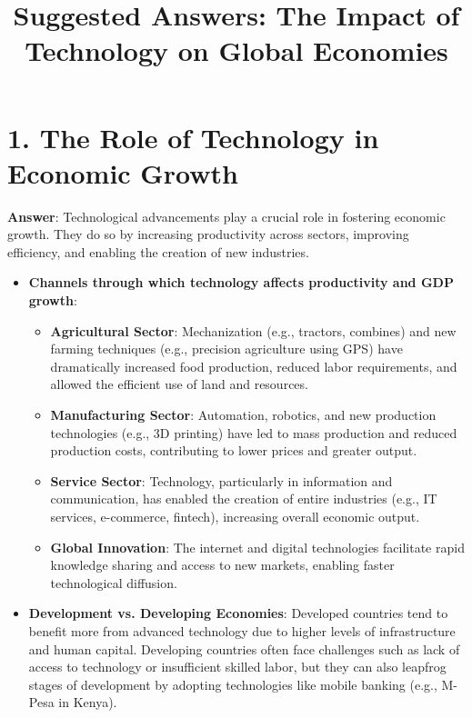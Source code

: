 \documentclass{article}
\title{Suggested Answers: The Impact of Technology on Global Economies}
\author{}
\date{}
\begin{document}
\maketitle

\section*{1. The Role of Technology in Economic Growth}
\textbf{Answer}:  
Technological advancements play a crucial role in fostering economic growth. They do so by increasing productivity across sectors, improving efficiency, and enabling the creation of new industries. 

\begin{itemize}
    \item \textbf{Channels through which technology affects productivity and GDP growth}:
    \begin{itemize}
        \item \textbf{Agricultural Sector}: Mechanization (e.g., tractors, combines) and new farming techniques (e.g., precision agriculture using GPS) have dramatically increased food production, reduced labor requirements, and allowed the efficient use of land and resources.
        \item \textbf{Manufacturing Sector}: Automation, robotics, and new production technologies (e.g., 3D printing) have led to mass production and reduced production costs, contributing to lower prices and greater output.
        \item \textbf{Service Sector}: Technology, particularly in information and communication, has enabled the creation of entire industries (e.g., IT services, e-commerce, fintech), increasing overall economic output.
        \item \textbf{Global Innovation}: The internet and digital technologies facilitate rapid knowledge sharing and access to new markets, enabling faster technological diffusion.
    \end{itemize}
    
    \item \textbf{Development vs. Developing Economies}:  
    Developed countries tend to benefit more from advanced technology due to higher levels of infrastructure and human capital. Developing countries often face challenges such as lack of access to technology or insufficient skilled labor, but they can also leapfrog stages of development by adopting technologies like mobile banking (e.g., M-Pesa in Kenya).
\end{itemize}
\newpage
\end{document}

